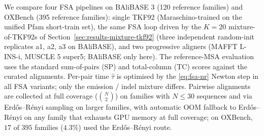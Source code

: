 
We compare four FSA pipelines on BAliBASE 3 (120 reference
families) and OXBench (395 reference families): single TKF92
(Maraschino-trained on the unified Pfam short-train set), the
same FSA loop driven by the $K = 20$ mixture-of-TKF92s of
Section~\ref{sec:results-mixture-tkf92} (three independent
random-init replicates a1, a2, a3 on BAliBASE), and two progressive
aligners (MAFFT L-INS-i, MUSCLE 5 super5; BAliBASE only here).
The reference-MSA evaluation uses the standard sum-of-pairs (SP)
and total-column (TC) scores against the curated alignments.
Per-pair time $\hat\tau$ is optimised by the
\eqref{eq:fsa-nr} Newton step in all FSA variants; only the
emission / indel mixture differs.  Pairwise alignments are
collected at full coverage ($\binom{N}{2}$) on families with
$N \leq 30$ sequences and via Erd\H{o}s--R\'enyi sampling on
larger families, with automatic OOM fallback to Erd\H{o}s--R\'enyi
on any family that exhausts GPU memory at full coverage; on
OXBench, $17$ of $395$ families ($4.3\%$) used the
Erd\H{o}s--R\'enyi route.

